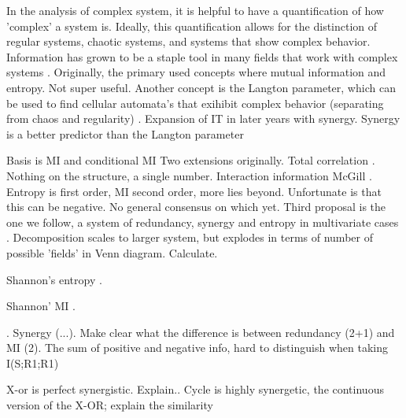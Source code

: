\documentclass[../main.tex]{subfiles}
\begin{document}
In the analysis of complex system, it is helpful to have a quantification of how 'complex' a system is.
Ideally, this quantification allows for the distinction of regular systems, chaotic systems, and systems that show complex behavior.
Information has grown to be a staple tool in many fields that work with complex systems \cite{williams2010nonnegative}. %
Originally, the primary used concepts where mutual information and entropy.
Not super useful.
Another concept is the Langton parameter, which can be used to find cellular automata's that exihibit complex behavior (separating from chaos and regularity) \cite{langton1990computation}.
Expansion of IT in later years with synergy.
Synergy is a better predictor than the Langton parameter \cite{9999QuaxChli}

Basis is MI and conditional MI
Two extensions originally.
Total correlation \cite{watanabe1960information}. Nothing on the structure, a single number.
Interaction information McGill \cite{mcgill1954multivariate}. Entropy is first order, MI second order, more lies beyond. Unfortunate is that this can be negative.
No general consensus on which yet.
Third proposal is the one we follow, a system of redundancy, synergy and entropy in multivariate cases \cite{williams2010nonnegative}.
Decomposition scales to larger system, but explodes in terms of number of possible 'fields' in Venn diagram.
Calculate.

Shannon's entropy \cite{shannon1949mathematical}.

Shannon' MI \cite{shannon1949mathematical}.

\cite{williams2010nonnegative}.
Synergy (...).
Make clear what the difference is between redundancy (2+1) and MI (2).
The sum of positive and negative info, hard to distinguish when taking I(S;R1;R1)

X-or is perfect synergistic.
Explain..
Cycle is highly synergetic, the continuous version of the X-OR; explain the similarity
\end{document}
